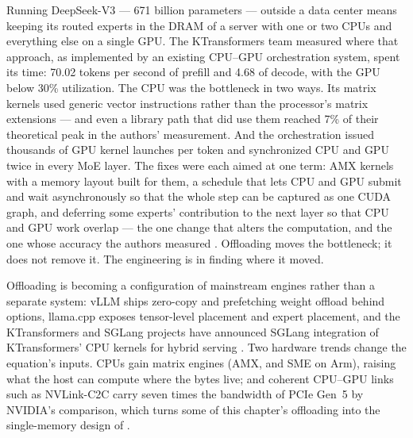 Running DeepSeek-V3 --- 671 billion parameters --- outside a data center means
keeping its routed experts in the DRAM of a server with one or two CPUs and
everything else on a single GPU. The KTransformers team measured where that
approach, as implemented by an existing CPU--GPU orchestration system, spent its
time: 70.02 tokens per second of prefill and 4.68 of decode, with the GPU below
30\% utilization. The CPU was the bottleneck in two ways. Its matrix kernels used
generic vector instructions rather than the processor's matrix extensions ---
and even a library path that did use them reached 7\% of their theoretical
peak in the authors' measurement. And the orchestration issued thousands of GPU
kernel launches per token and synchronized CPU and GPU twice in every MoE
layer.
The fixes were each aimed at one term: AMX kernels with a memory layout built
for them, a schedule that lets CPU and GPU submit and wait asynchronously so
that the whole step can be captured as one CUDA graph, and deferring some
experts' contribution to the next layer so that CPU and GPU work overlap ---
the one change that alters the computation, and the one whose accuracy the
authors measured \cite{chen2025ktransformers}. Offloading moves the bottleneck;
it does not remove it. The engineering is in finding where it moved.


Offloading is becoming a configuration of mainstream engines rather than a
separate system: vLLM ships zero-copy and prefetching weight offload behind
options, llama.cpp exposes tensor-level placement and expert placement, and
the KTransformers and SGLang projects have announced SGLang integration of
KTransformers' CPU kernels for hybrid serving \cite{lmsys2025ktransformers}. Two hardware trends change the
equation's inputs. CPUs gain matrix engines (AMX, and SME on Arm), raising what
the host can compute where the bytes live; and coherent CPU--GPU links such as
NVLink-C2C carry seven times the bandwidth of PCIe Gen~5 by NVIDIA's
comparison, which turns some of this chapter's offloading into the
single-memory design of .

\ExercisesSection


